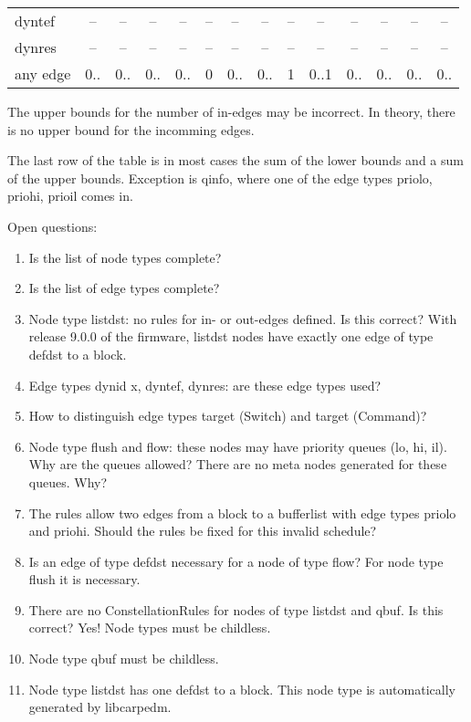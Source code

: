 \begin{table}
\begin{adjustwidth}{-21mm}{}
\begin{tabular}[t]{|p{17.4mm}|c|c|c|c|c|c|c|c|c|c|c|c|c|}
dyntef            & --         & --              & --         & --         & --           & --         & --          & --        & --         & --               & --          & --         & --       \\
dynres            & --         & --              & --         & --         & --           & --         & --          & --        & --         & --               & --          & --         & --       \\
any edge          & 0..        & 0..             & 0..        & 0..        & 0            & 0..        & 0..         & 1         & 0..1       & 0..              & 0..         & 0..        & 0..      \\
\hline
\end{tabular}
\end{adjustwidth}
The upper bounds for the number of in-edges may be incorrect. In theory, there is no upper bound for the incomming edges.

The last row of the table is in most cases the sum of the lower bounds and a sum of the upper bounds. Exception is qinfo, where one of the edge types priolo, priohi, prioil comes in.
\end{table}

Open questions:
\begin{enumerate}
\item Is the list of node types complete?
\item Is the list of edge types complete?
\item Node type listdst: no rules for in- or out-edges defined. Is this correct? With release 9.0.0 of the firmware,
listdst nodes have exactly one edge of type defdst to a block.
\item Edge types dynid x, dyntef, dynres: are these edge types used?
\item How to distinguish edge types target (Switch) and target (Command)?
\item Node type flush and flow: these nodes may have priority queues (lo, hi, il). Why are the queues allowed?
There are no meta nodes generated for these queues. Why?
\item The rules allow two edges from a block to a bufferlist with edge types priolo and priohi.
Should the rules be fixed for this invalid schedule?
\item Is an edge of type defdst necessary for a node of type flow? For node type flush it is necessary.
\item There are no ConstellationRules for nodes of type listdst and qbuf. Is this correct? Yes! Node types must be childless.
\item Node type qbuf must be childless.
\item Node type listdst has one defdst to a block. This node type is automatically generated by libcarpedm.
\end{enumerate}
